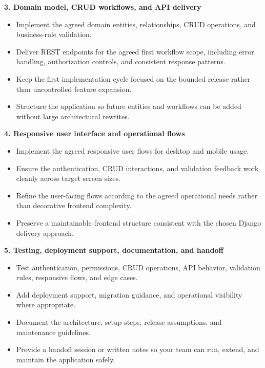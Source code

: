\documentclass[11pt,a4paper]{article}
\begin{document}
\textbf{3. Domain model, CRUD workflows, and API delivery}\par

\begin{itemize}
\item Implement the agreed domain entities, relationships, CRUD operations, and business-rule validation.
\item Deliver REST endpoints for the agreed first workflow scope, including error handling, authorization controls, and consistent response patterns.
\item Keep the first implementation cycle focused on the bounded release rather than uncontrolled feature expansion.
\item Structure the application so future entities and workflows can be added without large architectural rewrites.
\end{itemize}

\textbf{4. Responsive user interface and operational flows}\par

\begin{itemize}
\item Implement the agreed responsive user flows for desktop and mobile usage.
\item Ensure the authentication, CRUD interactions, and validation feedback work cleanly across target screen sizes.
\item Refine the user-facing flows according to the agreed operational needs rather than decorative frontend complexity.
\item Preserve a maintainable frontend structure consistent with the chosen Django delivery approach.
\end{itemize}

\textbf{5. Testing, deployment support, documentation, and handoff}\par

\begin{itemize}
\item Test authentication, permissions, CRUD operations, API behavior, validation rules, responsive flows, and edge cases.
\item Add deployment support, migration guidance, and operational visibility where appropriate.
\item Document the architecture, setup steps, release assumptions, and maintenance guidelines.
\item Provide a handoff session or written notes so your team can run, extend, and maintain the application safely.
\end{itemize}
\end{document}
